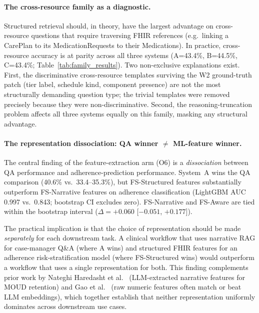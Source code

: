 \paragraph{The cross-resource family as a diagnostic.}
Structured retrieval should, in theory, have the largest advantage on cross-resource
questions that require traversing FHIR references (e.g.\ linking a CarePlan to its
MedicationRequests to their Medications).  In practice, cross-resource accuracy is
at parity across all three systems (A=43.4\%, B=44.5\%, C=43.4\%;
Table~\ref{tab:family_results}).  Two non-exclusive explanations exist.  First,
the discriminative cross-resource templates surviving the W2 ground-truth patch
(tier label, schedule kind, component presence) are not the most structurally demanding
question type; the trivial templates were removed precisely because they were
non-discriminative.  Second, the reasoning-truncation problem affects all three systems
equally on this family, masking any structural advantage.

\paragraph{The representation dissociation: QA winner $\neq$ ML-feature winner.}
The central finding of the feature-extraction arm (O6) is a \emph{dissociation} between
QA performance and adherence-prediction performance.  System~A wins the QA comparison
(40.6\% vs.\ 33.4--35.3\%), but FS-Structured features substantially outperform
FS-Narrative features on adherence classification (LightGBM AUC 0.997 vs.\ 0.843;
bootstrap CI excludes zero).  FS-Narrative and FS-Aware are tied within the bootstrap
interval ($\Delta{=}+0.060$ [$-0.051$, $+0.177$]).

The practical implication is that the choice of representation should be made
\emph{separately} for each downstream task.  A clinical workflow that uses narrative RAG
for case-manager Q\&A (where A wins) and structured FHIR features for an adherence
risk-stratification model (where FS-Structured wins) would outperform a workflow that
uses a single representation for both.  This finding complements prior work by Nateghi
Haredasht et al.~\citep{nateghi2025predicting} (LLM-extracted narrative features
for MOUD retention) and Gao et al.~\citep{gao2024raw} (raw numeric features
often match or beat LLM embeddings), which together establish that neither representation
uniformly dominates across downstream use cases.

